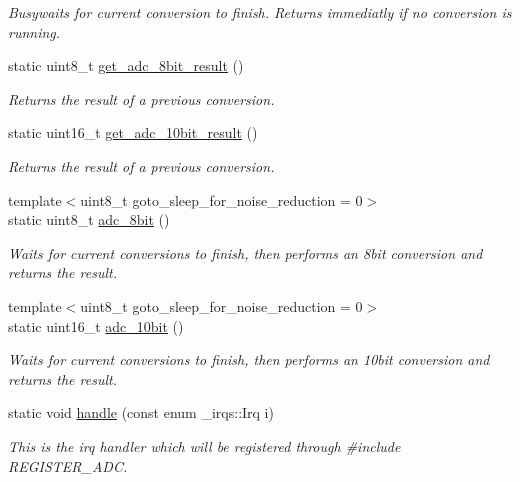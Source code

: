 \begin{DoxyCompactItemize}
\begin{DoxyCompactList}\small\item\em Busywaits for current conversion to finish. Returns immediatly if no conversion is running. \end{DoxyCompactList}\item 
static uint8\+\_\+t \hyperlink{classadc_1_1Adc_a780877e68b2f2d61596e594db04179ed}{get\+\_\+adc\+\_\+8bit\+\_\+result} ()
\begin{DoxyCompactList}\small\item\em Returns the result of a previous conversion. \end{DoxyCompactList}\item 
static uint16\+\_\+t \hyperlink{classadc_1_1Adc_a4b6ffdcd526be74e01f39329a5f25d20}{get\+\_\+adc\+\_\+10bit\+\_\+result} ()
\begin{DoxyCompactList}\small\item\em Returns the result of a previous conversion. \end{DoxyCompactList}\item 
{\footnotesize template$<$uint8\+\_\+t goto\+\_\+sleep\+\_\+for\+\_\+noise\+\_\+reduction = 0$>$ }\\static uint8\+\_\+t \hyperlink{classadc_1_1Adc_ae289bfed72b4cfab79dae680cc4d9ab4}{adc\+\_\+8bit} ()
\begin{DoxyCompactList}\small\item\em Waits for current conversions to finish, then performs an 8bit conversion and returns the result. \end{DoxyCompactList}\item 
{\footnotesize template$<$uint8\+\_\+t goto\+\_\+sleep\+\_\+for\+\_\+noise\+\_\+reduction = 0$>$ }\\static uint16\+\_\+t \hyperlink{classadc_1_1Adc_a3d9614e14e56b6f7209040710ef6f022}{adc\+\_\+10bit} ()
\begin{DoxyCompactList}\small\item\em Waits for current conversions to finish, then performs an 10bit conversion and returns the result. \end{DoxyCompactList}\item 
static void \hyperlink{classadc_1_1Adc_a77d477385a502139b26c2f0ca83c2482}{handle} (const enum \+\_\+irqs\+::\+Irq i)
\begin{DoxyCompactList}\small\item\em This is the irq handler which will be registered through {\ttfamily \#include R\+E\+G\+I\+S\+T\+E\+R\+\_\+\+A\+DC}. \end{DoxyCompactList}\end{DoxyCompactItemize}


